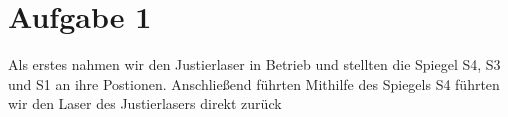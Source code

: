 \section{Aufgabe 1}

Als erstes nahmen wir den Justierlaser in Betrieb und stellten die Spiegel S4, S3 und S1 an ihre Postionen. Anschließend führten Mithilfe des Spiegels S4 führten wir den Laser des Justierlasers direkt zurück